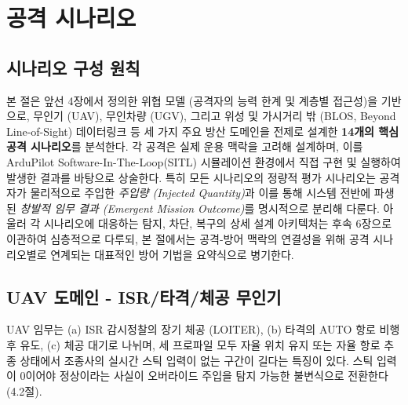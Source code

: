 \section{공격 시나리오}

\subsection{시나리오 구성 원칙}




본 절은 앞선 4장에서 정의한 위협 모델 (공격자의 능력 한계 및 계층별 접근성)을 기반으로, 무인기 (UAV), 무인차량 (UGV), 그리고 위성 및 가시거리 밖 (BLOS, Beyond Line-of-Sight) 데이터링크 등 세 가지 주요 방산 도메인을 전제로 설계한 \textbf{14개의 핵심 공격 시나리오}를 분석한다. 
%
각 공격은 실제 운용 맥락을 고려해 설계하며, 이를 ArduPilot Software-In-The-Loop(SITL) 시뮬레이션 환경에서 직접 구현 및 실행하여 발생한 결과를 바탕으로 상술한다. 
%
특히 모든 시나리오의 정량적 평가 시나리오는 공격자가 물리적으로 주입한 \emph{주입량 (Injected Quantity)}과 이를 통해 시스템 전반에 파생된 \emph{창발적 임무 결과 (Emergent Mission Outcome)}를 명시적으로 분리해 다룬다.  
%
아울러 각 시나리오에 대응하는 탐지, 차단, 복구의 상세 설계 아키텍처는 후속 6장으로 이관하여 심층적으로 다루되, 본 절에서는 공격-방어 맥락의 연결성을 위해 공격 시나리오별로 연계되는 대표적인 방어 기법을 요약식으로 병기한다.


\subsection{UAV 도메인 - ISR/타격/체공 무인기}

UAV 임무는 (a) ISR 감시정찰의 장기 체공 (LOITER), (b) 타격의 AUTO 항로 비행 후 유도, (c) 체공 대기로 나뉘며, 세 프로파일 모두 자율 위치 유지 또는 자율 항로 추종 상태에서 조종사의 실시간 스틱 입력이 없는 구간이 길다는 특징이 있다. 스틱 입력이 0이어야 정상이라는 사실이 오버라이드 주입을 탐지 가능한 불변식으로 전환한다 (4.2절).

